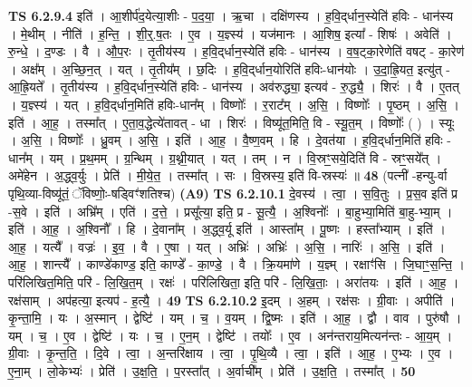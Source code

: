 \documentclass[17pt]{extarticle}
\begin{document}
                                \textbf{ TS 6.2.9.4} \newline
                  इति॑ । आ॒शीर्प॑द॒येत्या॒शीः - प॒द॒या॒ । ऋ॒चा । दक्षि॑णस्य । ह॒वि॒द्‌र्धान॒स्येति॑ हविः - धान॑स्य । मे॒थीम् । नीति॑ । ह॒न्ति॒ । शी॒र्॒.ष॒तः । ए॒व । य॒ज्ञ्स्य॑ । यज॑मानः । आ॒शिष॒ इत्या᳚ - शिषः॑ । अवेति॑ । रु॒न्धे॒ । द॒ण्डः । वै । औ॒प॒रः । तृ॒तीय॑स्य । ह॒वि॒द्‌र्धान॒स्येति॑ हविः - धान॑स्य । व॒ष॒ट्का॒रेणेति॑ वषट् - का॒रेण॑ । अक्ष᳚म् । अ॒च्छि॒न॒त् । यत् । तृ॒तीय᳚म् । छ॒दिः । ह॒वि॒द्‌र्धान॒योरिति॑ हविः-धान॑योः । उ॒दा॒ह्रि॒यत॒ इत्यु॑त् - आ॒ह्रि॒यते᳚ । तृ॒तीय॑स्य । ह॒वि॒द्‌र्धान॒स्येति॑ हविः - धान॑स्य । अव॑रुद्ध्या॒ इत्यव॑ - रु॒द्ध्यै॒ । शिरः॑ । वै । ए॒तत् । य॒ज्ञ्स्य॑ । यत् । ह॒वि॒द्‌र्धान॒मिति॑ हविः-धान᳚म् । विष्णोः᳚ । र॒राट᳚म् । अ॒सि॒ । विष्णोः᳚ । पृ॒ष्ठम् । अ॒सि॒ । इति॑ । आ॒ह॒ । तस्मा᳚त् । ए॒ता॒व॒द्धेत्ये॑तावत् - धा । शिरः॑ । विष्यू॑त॒मिति॒ वि - स्यू॒त॒म् । विष्णोः᳚ ( ) । स्यूः । अ॒सि॒ । विष्णोः᳚ । ध्रु॒वम् । अ॒सि॒ । इति॑ । आ॒ह॒ । वै॒ष्ण॒वम् । हि । दे॒वत॑या । ह॒वि॒द्‌र्धान॒मिति॑ हविः - धान᳚म् । यम् । प्र॒थ॒मम् । ग्र॒न्थिम् । ग्र॒थ्नी॒यात् । यत् । तम् । न । वि॒स्रꣳ॒॒सये॒दिति॑ वि - स्रꣳ॒॒सये᳚त् । अमे॑हेन । अ॒द्ध्व॒र्युः । प्रेति॑ । मी॒ये॒त॒ । तस्मा᳚त् । सः । वि॒स्रस्य॒ इति॑ वि-स्रस्यः॑ ॥ \textbf{  48 } \newline
                  \newline
                      (पत्नी॑ -हन्यु-र्वा पृथि॒व्या-विष्यू॑तं॒ ॅविष्णोः॒-षड्विꣳ॑शतिश्च)  \textbf{(A9)} \newline \newline
                                \textbf{ TS 6.2.10.1} \newline
                  दे॒वस्य॑ । त्वा॒ । स॒वि॒तुः । प्र॒स॒व इति॑ प्र -स॒वे । इति॑ । अभ्रि᳚म् । एति॑ । द॒त्ते॒ । प्रसू᳚त्या॒ इति॒ प्र - सू॒त्यै॒ । अ॒श्विनोः᳚ । बा॒हुभ्या॒मिति॑ बा॒हु-भ्या॒म् । इति॑ । आ॒ह॒ । अ॒श्विनौ᳚ । हि । दे॒वाना᳚म् । अ॒द्ध्व॒र्यू इति॑ । आस्ता᳚म् । पू॒ष्णः । हस्ता᳚भ्याम् । इति॑ । आ॒ह॒ । यत्यै᳚ । वज्रः॑ । इ॒व॒ । वै । ए॒षा । यत् । अभ्रिः॑ । अभ्रिः॑ । अ॒सि॒ । नारिः॑ । अ॒सि॒ । इति॑ । आ॒ह॒ । शान्त्यै᳚ । काण्डे॑काण्ड॒ इति॒ काण्डे᳚ - का॒ण्डे॒ । वै । क्रि॒यमा॑णे । य॒ज्ञ्म् । रक्षाꣳ॑सि । जि॒घाꣳ॒॒स॒न्ति॒ । परि॑लिखित॒मिति॒ परि॑ - लि॒खि॒त॒म् । रक्षः॑ । परि॑लिखिता॒ इति॒ परि॑ - लि॒खि॒ताः॒ । अरा॑तयः । इति॑ । आ॒ह॒ । रक्ष॑साम् । अप॑हत्या॒ इत्यप॑ - ह॒त्यै॒ । \textbf{  49} \newline
                  \newline
                                \textbf{ TS 6.2.10.2} \newline
                  इ॒दम् । अ॒हम् । रक्ष॑सः । ग्री॒वाः । अपीति॑ । कृ॒न्ता॒मि॒ । यः । अ॒स्मान् । द्वेष्टि॑ । यम् । च॒ । व॒यम् । द्वि॒ष्मः । इति॑ । आ॒ह॒ । द्वौ । वाव । पुरु॑षौ । यम् । च॒ । ए॒व । द्वेष्टि॑ । यः । च॒ । ए॒न॒म् । द्वेष्टि॑ । तयोः᳚ । ए॒व । अन॑न्तराय॒मित्यन॑न्तः - आ॒य॒म् । ग्री॒वाः । कृ॒न्त॒ति॒ । दि॒वे । त्वा॒ । अ॒न्तरि॑क्षाय । त्वा॒ । पृ॒थि॒व्यै । त्वा॒ । इति॑ । आ॒ह॒ । ए॒भ्यः । ए॒व । ए॒ना॒म् । लो॒केभ्यः॑ । प्रेति॑ । उ॒क्ष॒ति॒ । प॒रस्ता᳚त् । अ॒र्वाची᳚म् । प्रेति॑ । उ॒क्ष॒ति॒ । तस्मा᳚त् । \textbf{  50} \newline
\end{document}
